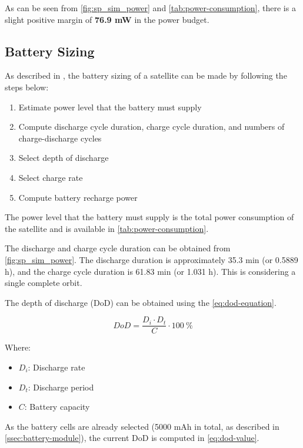 As can be seen from \autoref{fig:sp_sim_power} and \autoref{tab:power-consumption}, there is a slight positive margin of \textbf{76.9 mW} in the power budget.

\subsection{Battery Sizing}

As described in \cite{larson2005}, the battery sizing of a satellite can be made by following the steps below:

\begin{enumerate}
    \item Estimate power level that the battery must supply
    \item Compute discharge cycle duration, charge cycle duration, and numbers of charge-discharge cycles
    \item Select depth of discharge
    \item Select charge rate
    \item Compute battery recharge power
\end{enumerate}

The power level that the battery must supply is the total power consumption of the satellite and is available in \autoref{tab:power-consumption}.

The discharge and charge cycle duration can be obtained from \autoref{fig:sp_sim_power}. The discharge duration is approximately 35.3 min (or 0.5889 h), and the charge cycle duration is 61.83 min (or 1.031 h). This is considering a single complete orbit.

The depth of discharge (DoD) can be obtained using the \autoref{eq:dod-equation}.

\begin{equation} \label{eq:dod-equation}
    DoD = \frac{D_{i} \cdot D_{t}}{C} \cdot 100\ \%
\end{equation}

Where:

\begin{itemize}
    \item $D_{i}$: Discharge rate
    \item $D_{t}$: Discharge period
    \item $C$: Battery capacity
\end{itemize}

As the battery cells are already selected (5000 mAh in total, as described in \autoref{ssec:battery-module}), the current DoD is computed in \autoref{eq:dod-value}.

